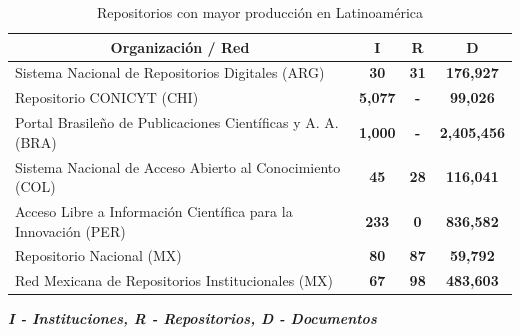 \begin{table}[htbp]
\caption{Repositorios con mayor producci\'on en Latinoam\'erica}
\begin{tabular}{| p{9.5cm}| p{1.5cm} | p{1.5cm} | p{1.5cm} |}
\hline
\multicolumn{1}{|c|}{\textbf{Organizaci\'on / Red}}                                    & \multicolumn{1}{c|}{\textbf{I}}     & \multicolumn{1}{c|}{\textbf{R}}  & \multicolumn{1}{c|}{\textbf{D}}         \\ \hline
\multicolumn{1}{|l|}{Sistema Nacional de  Repositorios Digitales (ARG)}              & \multicolumn{1}{c|}{\textbf{30}}    & \multicolumn{1}{c|}{\textbf{31}} & \multicolumn{1}{c|}{\textbf{176,927}}   \\ \hline
\multicolumn{1}{|l|}{Repositorio CONICYT (CHI)}                                      & \multicolumn{1}{c|}{\textbf{5,077}} & \multicolumn{1}{c|}{\textbf{-}}  & \multicolumn{1}{c|}{\textbf{99,026}}    \\ \hline
\multicolumn{1}{|l|}{Portal Brasileño de  Publicaciones Cient\'ificas y  A. A. (BRA)}  & \multicolumn{1}{c|}{\textbf{1,000}} & \multicolumn{1}{c|}{\textbf{-}}  & \multicolumn{1}{c|}{\textbf{2,405,456}} \\ \hline
\multicolumn{1}{|l|}{Sistema Nacional de  Acceso Abierto al Conocimiento (COL)}      & \multicolumn{1}{c|}{\textbf{45}}    & \multicolumn{1}{c|}{\textbf{28}} & \multicolumn{1}{c|}{\textbf{116,041}}   \\ \hline
\multicolumn{1}{|l|}{Acceso Libre a Informaci\'on Cient\'ifica para la Innovaci\'on (PER)} & \multicolumn{1}{c|}{\textbf{233}}   & \multicolumn{1}{c|}{\textbf{0}}  & \multicolumn{1}{c|}{\textbf{836,582}}   \\ \hline
\multicolumn{1}{|l|}{Repositorio Nacional (MX)}                                      & \multicolumn{1}{c|}{\textbf{80}}    & \multicolumn{1}{c|}{\textbf{87}} & \multicolumn{1}{c|}{\textbf{59,792}}    \\ \hline
\multicolumn{1}{|l|}{Red Mexicana de  Repositorios Institucionales (MX)}             & \multicolumn{1}{c|}{\textbf{67}}    & \multicolumn{1}{c|}{\textbf{98}} & \multicolumn{1}{c|}{\textbf{483,603}}  \\ \hline
\end{tabular}
\label{produccionRaas}
\footnotesize{ \textbf{\textit{I - Instituciones, R - Repositorios, D - Documentos}}}
\end{table}


